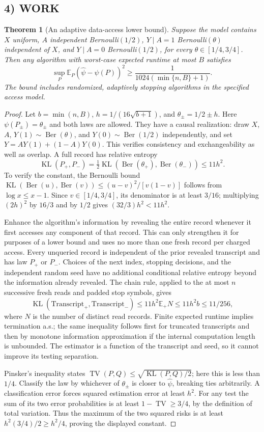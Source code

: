 \documentclass[11pt,a4paper]{article}
\newcommand{\E}{\mathbb E}
\newcommand{\KL}{\operatorname{KL}}
\newcommand{\TV}{\operatorname{TV}}
\newtheorem{theorem}{Theorem}
\theoremstyle{definition}
\begin{document}
\subsection*{4) WORK}
\begin{theorem}[An adaptive data-access lower bound]
Suppose the model contains $X$ uniform, $A$ independent Bernoulli$(1/2)$, $Y\mid A=1$ Bernoulli$(\theta)$ independent of $X$, and $Y\mid A=0$ Bernoulli$(1/2)$, for every $\theta\in[1/4,3/4]$. Then any algorithm with worst-case expected runtime at most $B$ satisfies
\[
 \sup_P\E_P(\widehat\psi-\psi(P))^2
 \ge\frac{1}{1024(\min\{n,B\}+1)}.
\]
The bound includes randomized, adaptively stopping algorithms in the specified access model.
\end{theorem}
\begin{proof}
Let $b=\min(n,B)$, $h=1/(16\sqrt{b+1})$, and $\theta_\pm=1/2\pm h$. Here $\psi(P_\pm)=\theta_\pm$ and both laws are allowed. They have a causal realization: draw $X$, $A$, $Y(1)\sim\operatorname{Ber}(\theta)$, and $Y(0)\sim\operatorname{Ber}(1/2)$ independently, and set $Y=AY(1)+(1-A)Y(0)$. This verifies consistency and exchangeability as well as overlap. A full record has relative entropy
\[
 \KL(P_+,P_-)=\tfrac12\KL(\operatorname{Ber}(\theta_+),\operatorname{Ber}(\theta_-))
 \le11h^2.
\]
To verify the constant, the Bernoulli bound $\KL(\operatorname{Ber}(u),\operatorname{Ber}(v))\le(u-v)^2/[v(1-v)]$ follows from $\log x\le x-1$. Since $v\in[1/4,3/4]$, its denominator is at least $3/16$; multiplying $(2h)^2$ by $16/3$ and by $1/2$ gives $(32/3)h^2<11h^2$.

Enhance the algorithm's information by revealing the entire record whenever it first accesses any component of that record. This can only strengthen it for purposes of a lower bound and uses no more than one fresh record per charged access. Every unqueried record is independent of the prior revealed transcript and has law $P_+$ or $P_-$. Choices of the next index, stopping decisions, and the independent random seed have no additional conditional relative entropy beyond the information already revealed. The chain rule, applied to the at most $n$ successive fresh reads and padded stop symbols, gives
\[
 \KL(\mathrm{Transcript}_+,\mathrm{Transcript}_-)
 \le11h^2\E_+N\le11h^2b\le11/256,
\]
where $N$ is the number of distinct read records. Finite expected runtime implies termination a.s.; the same inequality follows first for truncated transcripts and then by monotone information approximation if the internal computation length is unbounded. The estimator is a function of the transcript and seed, so it cannot improve its testing separation.

Pinsker's inequality states $\TV(P,Q)\le\sqrt{\KL(P,Q)/2}$; here this is less than $1/4$. Classify the law by whichever of $\theta_\pm$ is closer to $\widehat\psi$, breaking ties arbitrarily. A classification error forces squared estimation error at least $h^2$. For any test the sum of its two error probabilities is at least $1-\TV\ge3/4$, by the definition of total variation. Thus the maximum of the two squared risks is at least $h^2(3/4)/2\ge h^2/4$, proving the displayed constant.
\end{proof}
\end{document}
